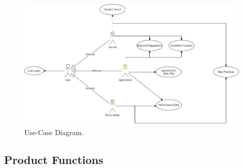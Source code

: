 \documentclass{article}
\begin{document}
    \begin{figure} [h]
        \centering
        \includegraphics[width=1\textwidth]{images/UseCaseDiagram.jpg}
        \caption{\label{fig:frog}Use-Case Diagram.}
    \end{figure}

\newpage

\subsection{Product Functions}
\setlength{\parindent}{0ex}
\end{document}
